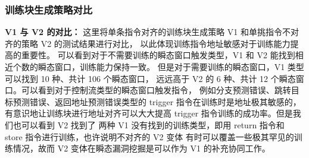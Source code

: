 \begin{table}[h!]
    \begin{center} 
    \caption{V4 瞬态窗口统计} 
    \label{table:v4-trans}  
    \end{center}
\end{table}

\subsubsection{训练块生成策略对比}

\textbf{V1 与 V2 的对比：}
这里将单条指令对齐的训练块生成策略 V1 和单挑指令不对齐的策略 V2 的测试结果进行对比，
以此体现训练指令地址敏感对于训练能力提高的重要性。
可以看到对于不需要训练的瞬态窗口触发类型，V1 和 V2 能找到相近个数的瞬态窗口，训练能力保持一致。
但是对于需要训练的瞬态窗口，V1 类型可以找到 10 种、共计 106 个瞬态窗口，
远远高于 V2 的 6 种、共计 12 个瞬态窗口。可以看到对于控制流类型的瞬态窗口触发指令，
例如分支预测错误、跳转目标预测错误、返回地址预测错误类型的 trigger 指令在训练时是地址极其敏感的，
有意识地让训练块进行地址对齐可以大大提高 trigger 指令训练的成功率。但是我们也可以看到 V2 找到了
两种 V1 没有找到的训练类型，即用 return 指令和 store 指令进行训练，也许说明不对齐的 V2 变体
有时可以覆盖一些极其罕见的训练情况，故而 V2 变体在瞬态漏洞挖掘是可以作为 V1 的补充协同工作。\par

